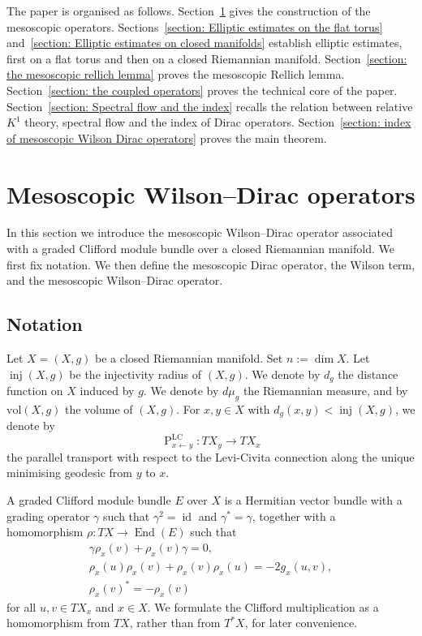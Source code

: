 \documentclass[a4paper,oneside,12pt]{amsart}
\theoremstyle{plain}
\theoremstyle{definition}
\theoremstyle{remark}
\DeclareMathOperator{\End}{End}
\DeclareMathOperator{\id}{id}
\DeclareMathOperator{\injectivityradius}{inj}
\newcommand{\dvol}{d\mu}
\newcommand{\volume}{\mathrm{vol}}
\newcommand{\paralleltransport}[2]{\operatorname{P}_{#2 \gets #1}}
\newcommand{\paralleltransportLC}[2]{\paralleltransport{#1}{#2}^{\mathrm{LC}}}
\newcommand{\cliffordmultiplication}{\rho}
\begin{document}
The paper is organised as follows.
Section~\ref{section: mesoscopic WD operators} gives the construction of the mesoscopic operators.
Sections~\ref{section: Elliptic estimates on the flat torus} and~\ref{section: Elliptic estimates on closed manifolds} establish elliptic estimates, first on a flat torus and then on a closed Riemannian manifold.
Section~\ref{section: the mesoscopic rellich lemma} proves the mesoscopic Rellich lemma.
Section~\ref{section: the coupled operators} proves the technical core of the paper.
Section~\ref{section: Spectral flow and the index} recalls the relation between relative $K^1$ theory, spectral flow and the index of Dirac operators.
Section~\ref{section: index of mesoscopic Wilson Dirac operators} proves the main theorem.

\section{Mesoscopic Wilson--Dirac operators}\label{section: mesoscopic WD operators}

In this section we introduce the mesoscopic Wilson--Dirac operator associated with a graded Clifford module bundle over a closed Riemannian manifold.
We first fix notation.
We then define the mesoscopic Dirac operator, the Wilson term, and the mesoscopic Wilson--Dirac operator.

\subsection{Notation}

Let $X=(X,g)$ be a closed Riemannian manifold.
Set $n := \dim X$.
Let $\injectivityradius(X,g)$ be the injectivity radius of $(X,g)$.
We denote by $d_g$ the distance function on $X$ induced by $g$.
We denote by $\dvol_g$ the Riemannian measure, and by $\volume(X,g)$ the volume of $(X,g)$.
For $x,y \in X$ with $d_g(x,y) < \injectivityradius(X,g)$, we denote by
\begin{equation}
  \paralleltransportLC{y}{x} \colon TX_y \to TX_x
\end{equation}
the parallel transport with respect to the Levi-Civita connection along the unique minimising geodesic from $y$ to $x$.

A graded Clifford module bundle $E$ over $X$ is a Hermitian vector bundle with a grading operator $\gamma$ such that $\gamma^2 = \id$ and $\gamma^* = \gamma$, together with a homomorphism $\cliffordmultiplication \colon TX \to \End(E)$ such that
\begin{gather}
  \gamma\cliffordmultiplication_x(v)+\cliffordmultiplication_x(v)\gamma=0, \\
  \cliffordmultiplication_x(u)\cliffordmultiplication_x(v) +\cliffordmultiplication_x(v)\cliffordmultiplication_x(u) = -2g_x(u,v), \\
  \cliffordmultiplication_x(v)^*=-\cliffordmultiplication_x(v)
\end{gather}
for all $u,v \in TX_x$ and $x \in X$.
We formulate the Clifford multiplication as a homomorphism from $TX$, rather than from $T^*X$, for later convenience.
\end{document}
